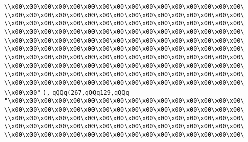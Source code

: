\verb|\\x00\x00\x00\x00\x00\x00\x00\x00\x00\x00\x00\x00\x00\x00\x00\x00\|\newline
\verb|\\x00\x00\x00\x00\x00\x00\x00\x00\x00\x00\x00\x00\x00\x00\x00\x00\|\newline
\verb|\\x00\x00\x00\x00\x00\x00\x00\x00\x00\x00\x00\x00\x00\x00\x00\x00\|\newline
\verb|\\x00\x00\x00\x00\x00\x00\x00\x00\x00\x00\x00\x00\x00\x00\x00\x00\|\newline
\verb|\\x00\x00\x00\x00\x00\x00\x00\x00\x00\x00\x00\x00\x00\x00\x00\x00\|\newline
\verb|\\x00\x00\x00\x00\x00\x00\x00\x00\x00\x00\x00\x00\x00\x00\x00\x00\|\newline
\verb|\\x00\x00\x00\x00\x00\x00\x00\x00\x00\x00\x00\x00\x00\x00\x00\x00\|\newline
\verb|\\x00\x00\x00\x00\x00\x00\x00\x00\x00\x00\x00\x00\x00\x00\x00\x00\|\newline
\verb|\\x00\x00\x00\x00\x00\x00\x00\x00\x00\x00\x00\x00\x00\x00\x00\x00\|\newline
\verb|\\x00\x00\x00\x00\x00\x00\x00\x00\x00\x00\x00\x00\x00\x00\x00\x00\|\newline
\verb|\\x00\x00"|\newline
\verb|),|\newline
\verb|qQQq(267,qQQq129,qQQq|\newline
\verb|"\x00\x00\x00\x00\x00\x00\x00\x00\x00\x00\x00\x00\x00\x00\x00\x00\|\newline
\verb|\\x00\x00\x00\x00\x00\x00\x00\x00\x00\x00\x00\x00\x00\x00\x00\x00\|\newline
\verb|\\x00\x00\x00\x00\x00\x00\x00\x00\x00\x00\x00\x00\x00\x00\x00\x00\|\newline
\verb|\\x00\x00\x00\x00\x00\x00\x00\x00\x00\x00\x00\x00\x00\x00\x00\x00\|\newline
\verb|\\x00\x00\x00\x00\x00\x00\x00\x00\x00\x00\x00\x00\x00\x00\x00\x00\|\newline
